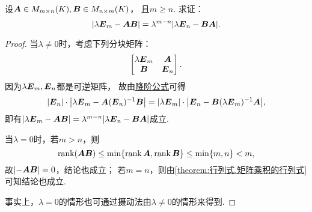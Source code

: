 \begin{example}\label{example:单位矩阵与两矩阵乘积之差.单位矩阵与两矩阵乘积之差的行列式}
设\(\boldsymbol{A} \in M_{m \times n}(K),
\boldsymbol{B} \in M_{n \times m}(K)\)，
且\(m \geq n\).
求证：\begin{equation}
	\abs{\lambda\boldsymbol{E}_m-\boldsymbol{A}\boldsymbol{B}} = \lambda^{m-n} \abs{\lambda\boldsymbol{E}_n-\boldsymbol{B}\boldsymbol{A}}.
\end{equation}
\begin{proof}
当\(\lambda\neq0\)时，考虑下列分块矩阵：\begin{equation*}
	\begin{bmatrix}
		\lambda\boldsymbol{E}_m & \boldsymbol{A} \\
		\boldsymbol{B} & \boldsymbol{E}_n
	\end{bmatrix}.
\end{equation*}
因为\(\lambda\boldsymbol{E}_m,\boldsymbol{E}_n\)都是可逆矩阵，
故由\hyperref[theorem:逆矩阵.行列式降阶定理]{降阶公式}可得\begin{equation*}
	\abs{\boldsymbol{E}_n} \cdot \abs{\lambda\boldsymbol{E}_m - \boldsymbol{A} (\boldsymbol{E}_n)^{-1} \boldsymbol{B}}
	= \abs{\lambda\boldsymbol{E}_m} \cdot \abs{\boldsymbol{E}_n - \boldsymbol{B} (\lambda\boldsymbol{E}_m)^{-1} \boldsymbol{A}},
\end{equation*}
即有\(\abs{\lambda\boldsymbol{E}_m-\boldsymbol{A}\boldsymbol{B}} = \lambda^{m-n} \abs{\lambda\boldsymbol{E}_n-\boldsymbol{B}\boldsymbol{A}}\)成立.

当\(\lambda=0\)时，若\(m>n\)，则\begin{equation*}
	\rank(\boldsymbol{A}\boldsymbol{B}) \leq \min\{\rank\boldsymbol{A},\rank\boldsymbol{B}\} \leq \min\{m,n\} < m,
\end{equation*}
故\(\abs{-\boldsymbol{A}\boldsymbol{B}}=0\)，结论也成立；
若\(m = n\)，则由\cref{theorem:行列式.矩阵乘积的行列式} 可知结论也成立.

事实上，\(\lambda=0\)的情形也可通过摄动法由\(\lambda\neq0\)的情形来得到.
\end{proof}
\end{example}

